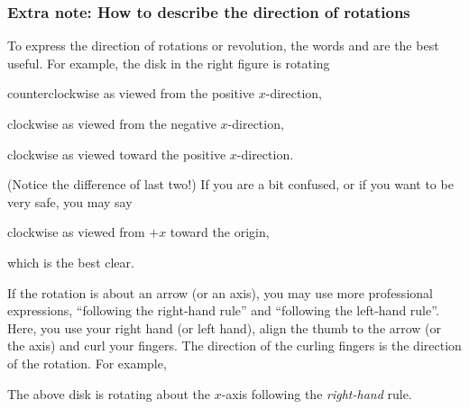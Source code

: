 \documentclass[11pt,pdfa,lastpage]{MishoNote}
\begin{document}
\subsubsection{Extra note: How to describe the direction of rotations}
\begin{minipage}[b]{0.66\textwidth}
To express the direction of rotations or revolution, the words  and  are the best useful.
For example, the disk in the right figure is rotating
\begin{miniitemize}
  \item counterclockwise as viewed from the positive $x$-direction,
  \item clockwise as viewed from the negative $x$-direction,
  \item clockwise as viewed toward the positive $x$-direction.
\end{miniitemize}
(Notice the difference of last two!) If you are a bit confused, or if you want to be very safe, you may say
\begin{miniitemize}
  \item clockwise as viewed from $+x$ toward the origin,
\end{miniitemize}
which is the best clear.
\end{minipage}\hfill
\begin{minipage}[b]{0.32\textwidth}
\vspace{3em}
\end{minipage}

\medskip

If the rotation is about an arrow (or an axis), you may use more professional expressions, ``following the right-hand rule'' and ``following the left-hand rule''.
Here, you use your right hand (or left hand), align the thumb to the arrow (or the axis) and curl your fingers. The direction of the curling fingers is the direction of the rotation. For example,
\begin{miniitemize}
  \item The above disk is rotating about the $x$-axis following the \emph{right-hand} rule.
\end{miniitemize}
\end{document}
